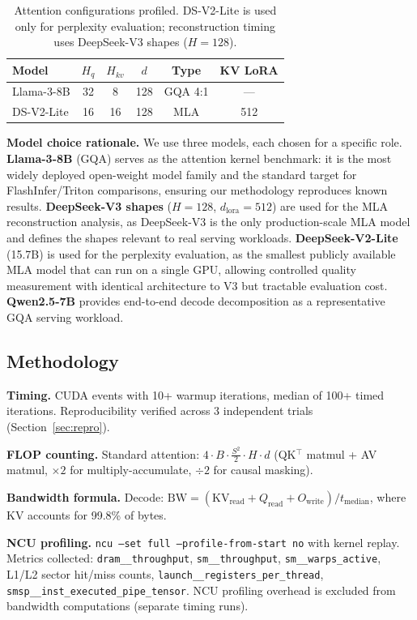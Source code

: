 \documentclass[10pt,twocolumn]{article}
\begin{document}
\begin{table}[h]
\centering
\small
\caption{Attention configurations profiled.  DS-V2-Lite is used only for perplexity evaluation; reconstruction timing uses DeepSeek-V3 shapes ($H{=}128$).}
\label{tab:configs}
\begin{tabular}{@{}lccccc@{}}
\toprule
Model & $H_q$ & $H_{kv}$ & $d$ & Type & KV LoRA \\
\midrule
Llama-3-8B  & 32 & 8  & 128 & GQA 4:1 & --- \\
DS-V2-Lite  & 16 & 16 & 128 & MLA      & 512 \\
\bottomrule
\end{tabular}
\end{table}

\textbf{Model choice rationale.}  We use three models, each chosen for a specific role.  \textbf{Llama-3-8B} (GQA) serves as the attention kernel benchmark: it is the most widely deployed open-weight model family and the standard target for FlashInfer/Triton comparisons, ensuring our methodology reproduces known results.  \textbf{DeepSeek-V3 shapes} ($H{=}128$, $d_\text{lora}{=}512$) are used for the MLA reconstruction analysis, as DeepSeek-V3 is the only production-scale MLA model and defines the shapes relevant to real serving workloads.  \textbf{DeepSeek-V2-Lite} (15.7B) is used for the perplexity evaluation, as the smallest publicly available MLA model that can run on a single GPU, allowing controlled quality measurement with identical architecture to V3 but tractable evaluation cost.  \textbf{Qwen2.5-7B} provides end-to-end decode decomposition as a representative GQA serving workload.

\subsection{Methodology}

\textbf{Timing.}  CUDA events with 10+ warmup iterations, median of 100+ timed iterations.  Reproducibility verified across 3 independent trials (Section~\ref{sec:repro}).

\textbf{FLOP counting.}  Standard attention: $4 \cdot B \cdot \frac{S^2}{2} \cdot H \cdot d$ (QK$^\top$ matmul + AV matmul, $\times 2$ for multiply-accumulate, $\div 2$ for causal masking).

\textbf{Bandwidth formula.}  Decode: $\text{BW} = (\text{KV}_\text{read} + Q_\text{read} + O_\text{write}) / t_\text{median}$, where KV accounts for 99.8\% of bytes.

\textbf{NCU profiling.}  \texttt{ncu --set full --profile-from-start no} with kernel replay.  Metrics collected: \texttt{dram\_\_throughput}, \texttt{sm\_\_throughput}, \texttt{sm\_\_warps\_active}, L1/L2 sector hit/miss counts, \texttt{launch\_\_registers\_per\_thread}, \texttt{smsp\_\_inst\_executed\_pipe\_tensor}.  NCU profiling overhead is excluded from bandwidth computations (separate timing runs).
\end{document}
